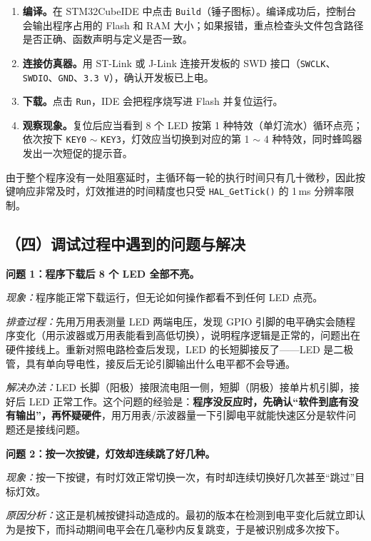 \documentclass[UTF8,zihao=5,fontset=fandol]{ctexart}
\begin{document}
\begin{reportsection}{\ProcessTitle}{\ProcessHint}
  \begin{enumerate}[label=\arabic*)]
    \item \textbf{编译。}在 STM32CubeIDE 中点击 \texttt{Build}（锤子图标）。编译成功后，控制台会输出程序占用的 Flash 和 RAM 大小；如果报错，重点检查头文件包含路径是否正确、函数声明与定义是否一致。
    \item \textbf{连接仿真器。}用 ST-Link 或 J-Link 连接开发板的 SWD 接口（\texttt{SWCLK}、\texttt{SWDIO}、\texttt{GND}、\texttt{3.3\,V}），确认开发板已上电。
    \item \textbf{下载。}点击 \texttt{Run}，IDE 会把程序烧写进 Flash 并复位运行。
    \item \textbf{观察现象。}复位后应当看到 8 个 LED 按第 1 种特效（单灯流水）循环点亮；依次按下 \texttt{KEY0} $\sim$ \texttt{KEY3}，灯效应当切换到对应的第 1 $\sim$ 4 种特效，同时蜂鸣器发出一次短促的提示音。
  \end{enumerate}

  由于整个程序没有一处阻塞延时，主循环每一轮的执行时间只有几十微秒，因此按键响应非常及时，灯效推进的时间精度也只受 \texttt{HAL\_GetTick()} 的 1\,ms 分辨率限制。

  \subsection*{（四）调试过程中遇到的问题与解决}

  \textbf{问题 1：程序下载后 8 个 LED 全部不亮。}

  \emph{现象：}程序能正常下载运行，但无论如何操作都看不到任何 LED 点亮。

  \emph{排查过程：}先用万用表测量 LED 两端电压，发现 GPIO 引脚的电平确实会随程序变化（用示波器或万用表能看到高低切换），说明程序逻辑是正常的，问题出在硬件接线上。重新对照电路检查后发现，LED 的长短脚接反了——LED 是二极管，具有单向导电性，接反后无论引脚输出什么电平都不会导通。

  \emph{解决办法：}LED 长脚（阳极）接限流电阻一侧，短脚（阴极）接单片机引脚，接好后 LED 正常工作。这个问题的经验是：\textbf{程序没反应时，先确认“软件到底有没有输出”，再怀疑硬件}，用万用表/示波器量一下引脚电平就能快速区分是软件问题还是接线问题。

  \textbf{问题 2：按一次按键，灯效却连续跳了好几种。}

  \emph{现象：}按一下按键，有时灯效正常切换一次，有时却连续切换好几次甚至“跳过”目标灯效。

  \emph{原因分析：}这正是机械按键抖动造成的。最初的版本在检测到电平变化后就立即认为是按下，而抖动期间电平会在几毫秒内反复跳变，于是被识别成多次按下。


\end{reportsection}
\end{document}
